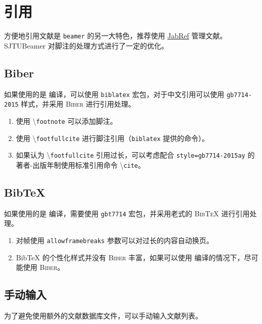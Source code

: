 \documentclass[
    UTF8,
    heading=true,
    12pt,
    a4paper
]{ctexrep}
\newenvironment{commentlist}{\begin{enumerate}\small}{\end{enumerate}}
\newcommand{\cmd}[1]{\textbackslash{}\texttt{#1}}
\newcommand{\cls}[1]{\texttt{#1}}
\newcommand{\pkg}[1]{\texttt{#1}}
\newcommand{\opt}[1]{\texttt{#1}}
\def\themename{\textsf{SJTUBeamer}}
\begin{document}
\chapter{引用}

方便地引用文献是 \cls{beamer} 的另一大特色，推荐使用 \href{https://www.jabref.org/}{JabRef} 管理文献。\themename{} 对脚注的处理方式进行了一定的优化。

\section{Biber}

\faApple{} \faLinux{} 如果使用的是  编译，可以使用 \pkg{biblatex} 宏包，对于中文引用可以使用 \opt{gb7714-2015} 样式，并采用 \textsc{Biber} 进行引用处理。


\begin{commentlist}
  \item 使用 \cmd{footnote} 可以添加脚注。
  \item 使用 \cmd{footfullcite} 进行脚注引用（\pkg{biblatex} 提供的命令）。
  \item 如果认为 \cmd{footfullcite} 引用过长，可以考虑配合 \opt{style=gb7714-2015ay} 的著者-出版年制使用标准引用命令 \cmd{cite}。
\end{commentlist}

\section{Bib\TeX{}}

\faWindows 如果使用的是  编译，需要使用 \pkg{gbt7714} 宏包，并采用老式的 \textsc{Bib\TeX{}} 进行引用处理。


\begin{commentlist}
  \item 对帧使用 \verb"allowframebreaks" 参数可以对过长的内容自动换页。
  \item Bib\TeX{} 的个性化样式并没有 \textsc{Biber} 丰富，如果可以使用  编译的情况下，尽可能使用 \textsc{Biber}。
\end{commentlist}

\section{手动输入}

为了避免使用额外的文献数据库文件，可以手动输入文献列表。
\end{document}
